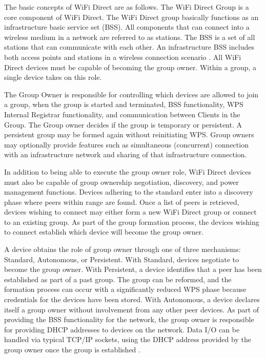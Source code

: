 \documentclass[10pt,twocolumn]{article}
\begin{document}
The basic concepts of WiFi Direct are as follows. 
The WiFi Direct Group is a core component of WiFi Direct. 
The WiFi Direct group basically functions as an infrastructure basic service set (BSS). 
All components that can connect into a wireless medium in a network are referred to as stations. 
The BSS is a set of all stations that can communicate with each other. 
An infrastructure BSS includes both access points and stations in a wireless connection scenario \cite{wirelesslanwiki}.
All WiFi Direct devices must be capable of becoming the group owner. 
Within a group, a single device takes on this role.
 
The Group Owner is responsible for controlling which devices are allowed to join a group, when the group is started and terminated, BSS functionality, WPS Internal Registrar functionality, and communication between Clients in the Group. 
The Group owner decides if the group is temporary or persistent. A persistent group may be formed again without reinitiating WPS.
Group owners may optionally provide features such as simultaneous (concurrent) connection with an infrastructure network and sharing of that infrastructure connection. 

In addition to being able to execute the group owner role, WiFi Direct devices must also be capable of group ownership negotiation, discovery, and power management functions.
 Devices adhering to the standard enter into a discovery phase where peers within range are found. 
Once a list of peers is retrieved, devices wishing to connect may either form a new  WiFi Direct group or connect to an existing group. 
As part of the group formation process, the devices wishing to connect establish which device will become the group owner.

A device obtains the role of group owner through one of three mechanisms: Standard, Autonomous, or Persistent. 
With Standard, devices negotiate to become the group owner.
With Persistent, a device identifies that a peer has been established as part of a past group. 
The group can be reformed, and the formation process can occur with a significantly reduced WPS phase because credentials for the devices have been stored.
With Autonomous, a device declares itself a group owner without involvement from any other peer devices. 
As part of providing the BSS functionality for the network, the group owner is responsible for providing DHCP addresses to devices on the network.
Data I/O can be handled via typical TCP/IP sockets, using the DHCP address provided by the group owner once the group is established \cite{wifiwhitepaper}.
\end{document}
